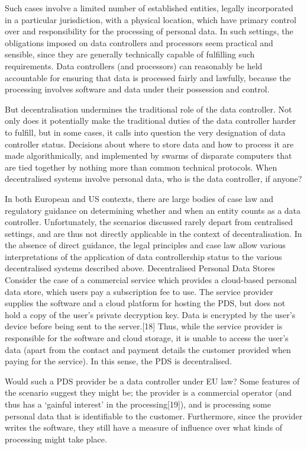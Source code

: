 \documentclass{acm_proc_article-sp}
\begin{document}
Such cases involve a limited number of established entities, legally incorporated in a particular jurisdiction, with a physical location, which have primary control over and responsibility for the processing of personal data. In such settings, the obligations imposed on data controllers and processors seem practical and sensible, since they are generally technically capable of fulfilling such requirements. Data controllers (and processors) can reasonably be held accountable for ensuring that data is processed fairly and lawfully, because the processing involves software and data under their possession and control.
 
But decentralisation undermines the traditional role of the data controller. Not only does it potentially make the traditional duties of the data controller harder to fulfill, but in some cases, it calls into question the very designation of data controller status. Decisions about where to store data and how to process it are made algorithmically, and implemented by swarms of disparate computers that are tied together by nothing more than common technical protocols. When decentralised systems involve personal data, who is the data controller, if anyone?
 
In both European and US contexts, there are large bodies of case law and regulatory guidance on determining whether and when an entity counts as a data controller. Unfortunately, the scenarios discussed rarely depart from centralised settings, and are thus not directly applicable in the context of decentralisation. In the absence of direct guidance, the legal principles and case law allow various interpretations of the application of data controllership status to the various decentralised systems described above.
Decentralised Personal Data Stores 
Consider the case of a commercial service which provides a cloud-based personal data store, which users pay a subscription fee to use. The service provider supplies the software and a cloud platform for hosting the PDS, but does not hold a copy of the user’s private decryption key. Data is encrypted by the user’s device before being sent to the server.[18] Thus, while the service provider is responsible for the software and cloud storage, it is unable to access the user’s data (apart from the contact and payment details the customer provided when paying for the service). In this sense, the PDS is decentralised.
 
Would such a PDS provider be a data controller under EU law? Some features of the scenario suggest they might be; the provider is a commercial operator (and thus has a ‘gainful interest’ in the processing[19]), and is processing some personal data that is identifiable to the customer. Furthermore, since the provider writes the software, they still have a measure of influence over what kinds of processing might take place.
 
\end{document}
